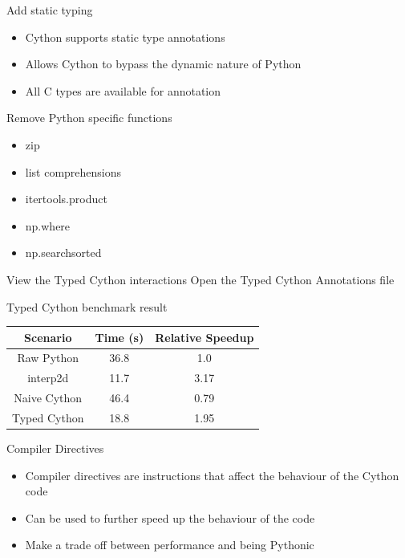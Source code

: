 \documentclass[12pt,xcolor=dvipsnames]{beamer}
\begin{document}
    \begin{frame}{Add static typing}
        \begin{itemize}
            \item Cython supports static type annotations
            \item Allows Cython to bypass the dynamic nature of Python
            \item All C types are available for annotation
        \end{itemize}
    \end{frame}


    \begin{frame}{Remove Python specific functions}
        \begin{itemize}
            \item zip
            \item list comprehensions
            \item itertools.product
            \item np.where
            \item np.searchsorted
        \end{itemize}
    \end{frame}

    \begin{frame}{View the Typed Cython interactions}
        Open the Typed Cython Annotations file
    \end{frame}

    \begin{frame}{Typed Cython benchmark result}
        \begin{center}
        \begin{tabular}{ | c | c | c | }
            \hline
            Scenario & Time (s) & Relative Speedup \\
            \hline
            Raw Python & 36.8 & 1.0 \\
            interp2d & 11.7 & 3.17 \\
            Naive Cython & 46.4 & 0.79 \\
            Typed Cython & 18.8 & 1.95 \\
            \hline
        \end{tabular}
        \end{center}
    \end{frame}

    \begin{frame}{Compiler Directives}
        \begin{itemize}
            \item Compiler directives are instructions that affect the behaviour of the Cython code
            \item Can be used to further speed up the behaviour of the code
            \item Make a trade off between performance and being Pythonic
        \end{itemize}
        
    \end{frame}
\end{document}
